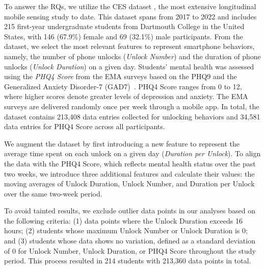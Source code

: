 To answer the RQs, we utilize the CES dataset \cite{nepal2024capturing}, the most extensive longitudinal mobile sensing study to date. This dataset spans from 2017 to 2022 and includes 215 first-year undergraduate students from Dartmouth College in the United States, with 146 (67.9\%) female and 69 (32.1\%) male participants.
From the dataset, we select the most relevant features to represent smartphone behaviors, namely, the number of phone unlocks (\textit{Unlock Number}) and the duration of phone unlocks (\textit{Unlock Duration}) on a given day.
Students' mental health was assessed using the \textit{PHQ4 Score} from the EMA surveys based on the PHQ9 and the Generalized Anxiety Disorder-7 (GAD7)~\cite{nepal2024capturing,williams2014gad}. PHQ4 Score ranges from 0 to 12, where higher scores denote greater levels of depression and anxiety.
The EMA surveys are delivered randomly once per week through a mobile app. In total, the dataset contains 213,408 data entries collected for unlocking behaviors and 34,581 data entries for PHQ4 Score across all participants.


We augment the dataset by first introducing a new feature to represent the average time spent on each unlock on a given day (\textit{Duration per Unlock}). To align the data with the PHQ4 Score, which reflects mental health status over the past two weeks, we introduce three additional features and calculate their values: the moving averages of {Unlock Duration}, {Unlock Number}, and {Duration per Unlock} over the same two-week period. 

To avoid tainted results, we exclude outlier data points in our analyses 
based on the following criteria: (1) data points where the {Unlock Duration} exceeds 16 hours; (2) students whose maximum {Unlock Number} or {Unlock Duration} is 0; and (3) students whose data shows no variation, defined as a standard deviation of 0 for {Unlock Number}, {Unlock Duration}, or {PHQ4 Score} throughout the study period.
This process resulted in 214 students with 213,360 data points in total.

